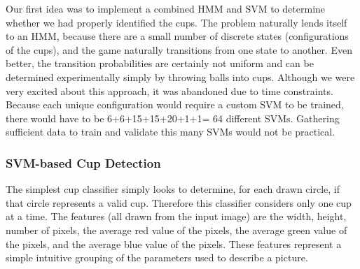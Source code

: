 \documentclass[letterpaper, 10 pt, conference]{ieeeconf}  %
\begin{document}
Our first idea was to implement a combined HMM and SVM to determine whether we had properly identified the cups.  The problem naturally lends itself to an HMM, because there are a small number of discrete states (configurations of the cups), and the game naturally transitions from one state to another.  Even better, the transition probabilities are certainly not uniform and can be determined experimentally simply by throwing balls into cups.  Although we were very excited about this approach, it was abandoned due to time constraints.  Because each unique configuration would require a custom SVM to be trained, there would have to be 6+6+15+15+20+1+1= 64 different SVMs.  Gathering sufficient data to train and validate this many SVMs would not be practical.

\subsubsection{SVM-based Cup Detection}

The simplest cup classifier simply looks to determine, for each drawn circle, if that circle represents a valid cup.  Therefore this classifier considers only one cup at a time.  The features (all drawn from the input image) are the width, height, number of pixels, the average red value of the pixels, the average green value of the pixels, and the average blue value of the pixels.  These features represent a simple intuitive grouping of the parameters used to describe a picture.  
\end{document}
